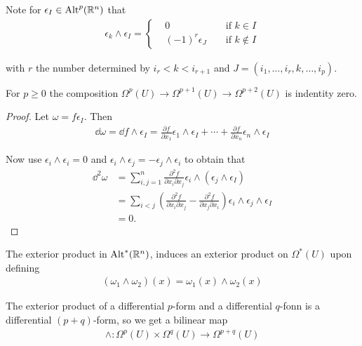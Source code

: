 Note for $\epsilon_I\in \operatorname{Alt}^p({\mathbb{R}}^n)$ that
\begin{align*}
  \epsilon_k\wedge\epsilon_I 
  = \left\{\begin{aligned}
    &0 && \text{ if } k\in I \\
    &(-1)^{r}\epsilon_{J} && \text{ if } k\not\in I
  \end{aligned}\right.
\end{align*}

with $r$ the number determined by $i_r < k < i_{r+1}$ and $J=(i_1, \ldots, i_r, k, \ldots, i_p)$.


\begin{lemma}\label{lemma:3-5}
  For $p\ge 0$ the composition $\Omega^p(U)\to\Omega^{p+1}(U)\to\Omega^{p+2}(U)$ is 
  indentity zero.
\end{lemma}

\begin{proof}
  Let $\omega = f\epsilon_I$. Then 
  \begin{align*}
    \dd\omega 
    = \dd f\wedge\epsilon_I
    = \frac{\partial f }{\partial x_1}\epsilon_1\wedge\epsilon_I + \cdots + \frac{\partial f}{\partial x_n}\epsilon_n\wedge\epsilon_I
  \end{align*}

  Now use $\epsilon_i\wedge\epsilon_i=0$ and $\epsilon_i\wedge\epsilon_j=-\epsilon_j\wedge\epsilon_i$ to obtain that 
  \begin{align*}
      \dd^{2}\omega 
      & = \sum_{i,j=1}^{n}\frac{\partial^{2}f}{\partial x_{i}\partial x_{j}}
        \epsilon_{i}\wedge(\epsilon_{j}\wedge\epsilon_{I}) \\
      & = \sum_{i<j}\left(\frac{\partial^{2}f}{\partial x_{i}\partial x_{j}}-\frac{\partial^{2}f}{\partial x_{j}\partial x_{i}}\right)
        \epsilon_{i}\wedge\epsilon_{j}\wedge\epsilon_{I}\\
      & = 0.
  \end{align*}
\end{proof}

The exterior product in $\operatorname{Alt}^{*}({\mathbb{R}}^n)$, induces an exterior product on $\Omega^*(U)$ upon 
defining
\begin{align*}
  (\omega_1\wedge\omega_2)(x) = \omega_1(x)\wedge\omega_2(x)
\end{align*}

The exterior product of a differential $p$-form and a differential $q$-fonn is a
differential $(p + q)$-form, so we get a bilinear map
\begin{align*}
  \wedge: \Omega^p(U)\times\Omega^q(U)\to\Omega^{p+q}(U)
\end{align*}

